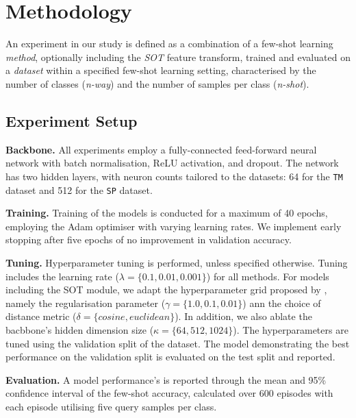 \section{Methodology}

An experiment in our study is defined as a combination of a few-shot learning \textit{method}, optionally including the \textit{SOT} feature transform, trained and evaluated on a \textit{dataset} within 
a specified few-shot learning setting, characterised by the number of classes (\textit{n-way}) and the number of samples per class (\textit{n-shot}).

\subsection{Experiment Setup}

\textbf{Backbone.} All experiments employ a fully-connected feed-forward neural network with batch normalisation, ReLU activation, and dropout. 
The network has two hidden layers, with neuron counts tailored to the datasets: 64 for the \texttt{TM} dataset and 512 for the \texttt{SP} dataset.

\textbf{Training.} Training of the models is conducted for a maximum of 40 epochs, employing the Adam optimiser with varying learning rates. 
We implement early stopping after five epochs of no improvement in validation accuracy. 

\textbf{Tuning.} Hyperparameter tuning is performed, unless specified otherwise. Tuning includes the learning rate ($\lambda = \{0.1, 0.01, 0.001\}$) for all methods. For models including the SOT module, 
we adapt the hyperparameter grid proposed by \citeauthor{sot}, namely the regularisation parameter ($\gamma = \{1.0, 0.1, 0.01\}$) ann the choice of distance metric ($\delta = \{cosine, euclidean\}$). 
In addition, we also ablate the bacbbone's hidden dimension size ($\kappa = \{64, 512, 1024\}$). The hyperparameters are tuned using the validation split of the dataset. 
The model demonstrating the best performance on the validation split is evaluated on the test split and reported.


\textbf{Evaluation.} A model performance's is reported through the mean and 95\% confidence interval of the few-shot accuracy, 
calculated over 600 episodes with each episode utilising five query samples per class.

